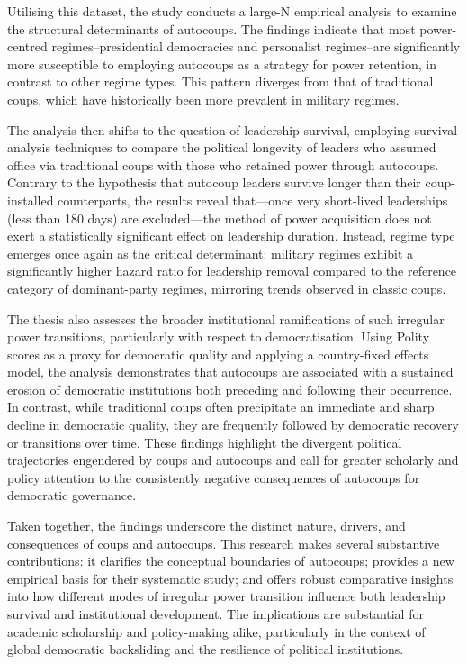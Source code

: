 \documentclass[
  12pt,
]{report}
\begin{document}
Utilising this dataset, the study conducts a large-N empirical analysis
to examine the structural determinants of autocoups. The findings
indicate that most power-centred regimes--presidential democracies and
personalist regimes--are significantly more susceptible to employing
autocoups as a strategy for power retention, in contrast to other regime
types. This pattern diverges from that of traditional coups, which have
historically been more prevalent in military regimes.

The analysis then shifts to the question of leadership survival,
employing survival analysis techniques to compare the political
longevity of leaders who assumed office via traditional coups with those
who retained power through autocoups. Contrary to the hypothesis that
autocoup leaders survive longer than their coup-installed counterparts,
the results reveal that---once very short-lived leaderships (less than
180 days) are excluded---the method of power acquisition does not exert
a statistically significant effect on leadership duration. Instead,
regime type emerges once again as the critical determinant: military
regimes exhibit a significantly higher hazard ratio for leadership
removal compared to the reference category of dominant-party regimes,
mirroring trends observed in classic coups.

The thesis also assesses the broader institutional ramifications of such
irregular power transitions, particularly with respect to
democratisation. Using Polity scores as a proxy for democratic quality
and applying a country-fixed effects model, the analysis demonstrates
that autocoups are associated with a sustained erosion of democratic
institutions both preceding and following their occurrence. In contrast,
while traditional coups often precipitate an immediate and sharp decline
in democratic quality, they are frequently followed by democratic
recovery or transitions over time. These findings highlight the
divergent political trajectories engendered by coups and autocoups and
call for greater scholarly and policy attention to the consistently
negative consequences of autocoups for democratic governance.

Taken together, the findings underscore the distinct nature, drivers,
and consequences of coups and autocoups. This research makes several
substantive contributions: it clarifies the conceptual boundaries of
autocoups; provides a new empirical basis for their systematic study;
and offers robust comparative insights into how different modes of
irregular power transition influence both leadership survival and
institutional development. The implications are substantial for academic
scholarship and policy-making alike, particularly in the context of
global democratic backsliding and the resilience of political
institutions.
\end{document}
